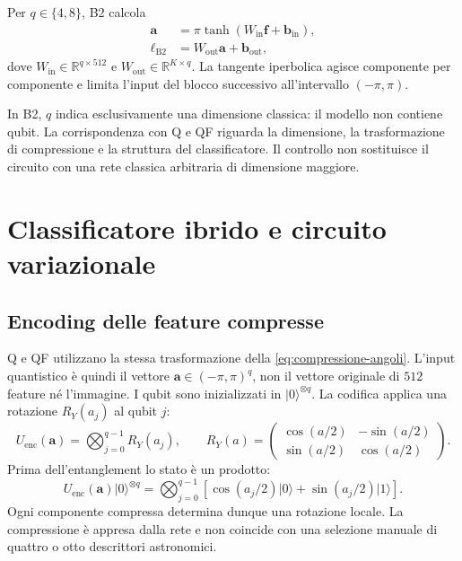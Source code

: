 Per \(q\in\{4,8\}\), B2 calcola
\begin{align}
  \boldsymbol a &= \pi\tanh(W_{\mathrm{in}}\boldsymbol f+
                       \boldsymbol b_{\mathrm{in}}),
                       \label{eq:compressione-angoli}\\
  \boldsymbol{\ell}_{\mathrm{B2}}
                &=W_{\mathrm{out}}\boldsymbol a+
                       \boldsymbol b_{\mathrm{out}},
                       \label{eq:baseline-b2}
\end{align}
dove \(W_{\mathrm{in}}\in\mathbb{R}^{q\times512}\) e
\(W_{\mathrm{out}}\in\mathbb{R}^{K\times q}\).
La tangente iperbolica agisce componente per componente e limita
l'input del blocco successivo all'intervallo \((-\pi,\pi)\).

In B2, \(q\) indica esclusivamente una dimensione classica: il modello
non contiene qubit. La corrispondenza con Q e QF riguarda la dimensione,
la trasformazione di compressione e la struttura del classificatore.
Il controllo non sostituisce il circuito con una rete classica arbitraria
di dimensione maggiore.

\section{Classificatore ibrido e circuito variazionale}
\label{sec:circuito-primario}

\subsection{Encoding delle feature compresse}

Q e QF utilizzano la stessa trasformazione della
\cref{eq:compressione-angoli}. L'input quantistico è quindi il vettore
\(\boldsymbol a\in(-\pi,\pi)^q\), non il vettore originale di \(512\)
feature né l'immagine. I qubit sono inizializzati in
\(\lvert0\rangle^{\otimes q}\). La codifica applica una rotazione
\(R_Y(a_j)\) al qubit \(j\):
\begin{equation}
  U_{\mathrm{enc}}(\boldsymbol a)
   =\bigotimes_{j=0}^{q-1} R_Y(a_j),\qquad
  R_Y(a)=
  \begin{pmatrix}
   \cos(a/2)&-\sin(a/2)\\
   \sin(a/2)&\cos(a/2)
  \end{pmatrix}.
  \label{eq:encoding-ry}
\end{equation}
Prima dell'entanglement lo stato è un prodotto:
\[
  U_{\mathrm{enc}}(\boldsymbol a)\lvert0\rangle^{\otimes q}
   =\bigotimes_{j=0}^{q-1}
     \left[\cos(a_j/2)\lvert0\rangle+
           \sin(a_j/2)\lvert1\rangle\right].
\]
Ogni componente compressa determina dunque una rotazione locale.
La compressione è appresa dalla rete e non coincide con una selezione
manuale di quattro o otto descrittori astronomici.

